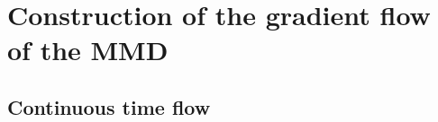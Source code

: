 \section{Construction of the gradient flow of the MMD}\label{sec:appendix_gradient_flow}


\subsection{Continuous time flow}


%

%
%



